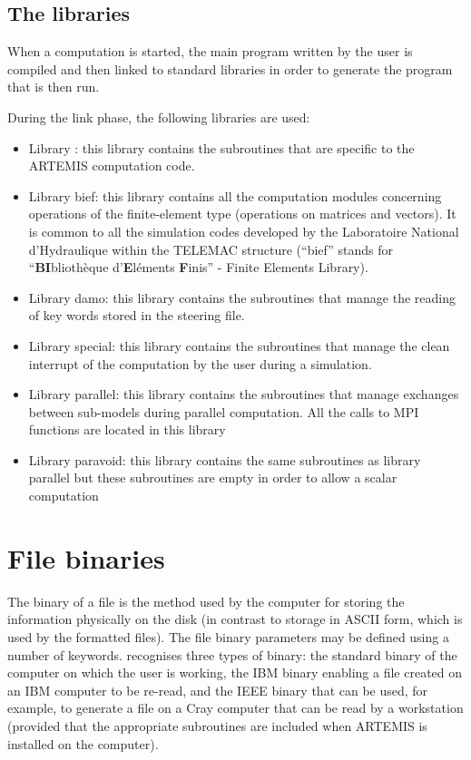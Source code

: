 \subsection{The libraries}

When a computation is started, the main program written by the user is compiled
and then linked to standard libraries in order to generate the program that is
then run.

During the link phase, the following libraries are used:

\begin{itemize}
\item  Library \artemis{}: this library contains the subroutines that are
  specific to the ARTEMIS computation code.

\item  Library bief: this library contains all the computation modules
  concerning operations of the finite-element type (operations on matrices and
    vectors). It is common to all the simulation codes developed by the
    Laboratoire National d'Hydraulique within the TELEMAC structure
    (``bief'' stands for ``\textbf{BI}blioth\`{e}que
    d'\textbf{E}l\'{e}ments \textbf{F}inis'' - Finite Elements Library).

\item  Library damo: this library contains the subroutines that manage the
  reading of key words stored in the steering file.

\item  Library special: this library contains the subroutines that manage the
  clean interrupt of the computation by the user during a simulation.

\item  Library parallel: this library contains the subroutines that manage
  exchanges between sub-models during parallel computation. All the calls to
    MPI functions are located in this library

\item  Library paravoid: this library contains the same subroutines as library
  parallel but these subroutines are empty in order to allow a scalar
    computation
\end{itemize}


\section{File binaries}

The binary of a file is the method used by the computer for storing the
information physically on the disk (in contrast to storage in ASCII form, which
is used by the formatted files). The file binary parameters may be defined
using a number of keywords. \artemis{} recognises three types of binary: the
standard binary of the computer on which the user is working, the IBM binary
enabling a file created on an IBM computer to be re-read, and the IEEE binary
that can be used, for example, to generate a file on a Cray computer that can
be read by a workstation (provided that the appropriate subroutines are
included when ARTEMIS is installed on the computer).

